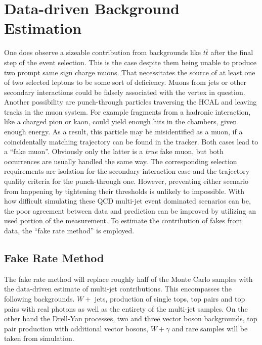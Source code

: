 \chapter{Data-driven Background Estimation}
\label{cha:datadrivenbg}

One does observe a sizeable contribution from backgrounds like $t\bar{t}$ after the final step of the event selection. This is the case despite them being unable to produce two prompt same sign charge muons. That necessitates the source of at least one of two selected leptons to be some sort of deficiency. Muons from jets or other secondary interactions could be falsely associated with the vertex in question. Another possibility are punch-through particles traversing the HCAL and leaving tracks in the muon system. For example fragments from a hadronic interaction, like a charged pion or kaon, could yield enough hits in the chambers, given enough energy. As a result, this particle may be misidentified as a muon, if a coincidentally matching trajectory can be found in the tracker. Both cases lead to a ``fake muon''. Obviously only the latter is a \textit{true} fake muon, but both occurrences are usually handled the same way. The corresponding selection requirements are isolation for the secondary interaction case and the trajectory quality criteria for the punch-through one. However, preventing either scenario from happening by tightening their thresholds is unlikely to impossible. With how difficult simulating these QCD multi-jet event dominated scenarios can be, the poor agreement between data and prediction can be improved by utilizing an used portion of the measurement. To estimate the contribution of fakes from data, the ``fake rate method'' is employed.


\section{Fake Rate Method}
\label{sec:fakerate}

The fake rate method will replace roughly half of the Monte Carlo samples with the data-driven estimate of multi-jet contributions. This encompasses the following backgrounds. $W +$ jets, production of single tops, top pairs and top pairs with real photons as well as the entirety of the multi-jet samples. On the other hand the Drell-Yan processes, two and three vector boson backgrounds, top pair production with additional vector bosons, $W + \gamma$ and rare samples will be taken from simulation.

